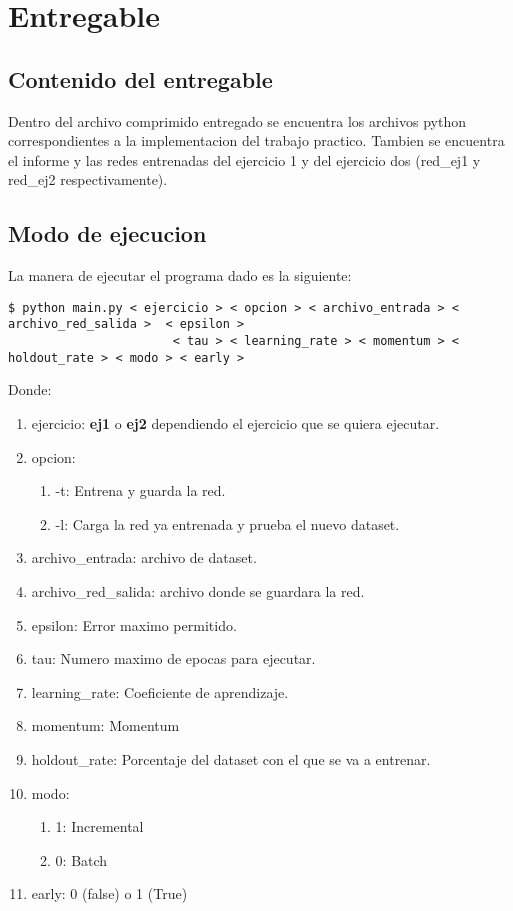 \section{Entregable}
\subsection{Contenido del entregable}

Dentro del archivo comprimido entregado se encuentra los archivos python correspondientes a la implementacion del trabajo practico. Tambien se encuentra el informe y las redes entrenadas del ejercicio 1 y del ejercicio dos (red\_ej1 y red\_ej2 respectivamente).
\subsection{Modo de ejecucion}

La manera de ejecutar el programa dado es la siguiente:


\begin{verbatim}
$ python main.py < ejercicio > < opcion > < archivo_entrada > < archivo_red_salida >  < epsilon > 
                       < tau > < learning_rate > < momentum > < holdout_rate > < modo > < early >
\end{verbatim}

Donde:

\begin{enumerate}
\item ejercicio: \textbf{ej1} o \textbf{ej2} dependiendo el ejercicio que se quiera ejecutar.
\item opcion: 
\begin{enumerate}
\item -t: Entrena y guarda la red.
\item -l: Carga la red ya entrenada y prueba el nuevo dataset.
\end{enumerate}
\item archivo\_entrada: archivo de dataset.
\item archivo\_red\_salida: archivo donde se guardara la red.
\item epsilon: Error maximo permitido.
\item tau: Numero maximo de epocas para ejecutar.
\item learning\_rate: Coeficiente de aprendizaje.
\item momentum: Momentum
\item holdout\_rate: Porcentaje del dataset con el que se va a entrenar.
\item modo: 
\begin{enumerate}
\item 1: Incremental
\item 0: Batch
\end{enumerate}
\item early: 0 (false) o 1 (True)
\end{enumerate}


